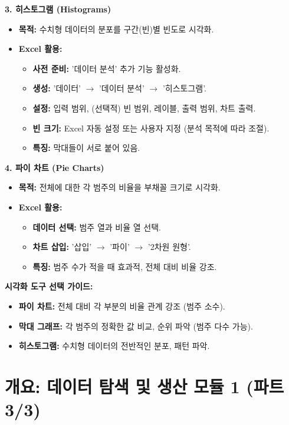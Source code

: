 \documentclass[11pt,a4paper]{article}
\begin{document}
\begin{tcolorbox}[colback=myblue!5!white,colframe=myblue!75!black,title=\textbf{데이터 요약 및 시각화 핵심 도구}]
\textbf{3. 히스토그램 (Histograms)}
\begin{itemize}
    \item \textbf{목적:} 수치형 데이터의 분포를 구간(빈)별 빈도로 시각화.
    \item \textbf{Excel 활용:}
    \begin{itemize}
        \item \textbf{사전 준비:} '데이터 분석' 추가 기능 활성화.
        \item \textbf{생성:} '데이터' $\rightarrow$ '데이터 분석' $\rightarrow$ '히스토그램'.
        \item \textbf{설정:} 입력 범위, (선택적) 빈 범위, 레이블, 출력 범위, 차트 출력.
        \item \textbf{빈 크기:} Excel 자동 설정 또는 사용자 지정 (분석 목적에 따라 조절).
        \item \textbf{특징:} 막대들이 서로 붙어 있음.
    \end{itemize}
\end{itemize}

\textbf{4. 파이 차트 (Pie Charts)}
\begin{itemize}
    \item \textbf{목적:} 전체에 대한 각 범주의 비율을 부채꼴 크기로 시각화.
    \item \textbf{Excel 활용:}
    \begin{itemize}
        \item \textbf{데이터 선택:} 범주 열과 비율 열 선택.
        \item \textbf{차트 삽입:} '삽입' $\rightarrow$ '파이' $\rightarrow$ '2차원 원형'.
        \item \textbf{특징:} 범주 수가 적을 때 효과적, 전체 대비 비율 강조.
    \end{itemize}
\end{itemize}

\textbf{시각화 도구 선택 가이드:}
\begin{itemize}
    \item \textbf{파이 차트:} 전체 대비 각 부분의 비율 관계 강조 (범주 소수).
    \item \textbf{막대 그래프:} 각 범주의 정확한 값 비교, 순위 파악 (범주 다수 가능).
    \item \textbf{히스토그램:} 수치형 데이터의 전반적인 분포, 패턴 파악.
\end{itemize}
\end{tcolorbox}

\newpage

\newpage
\section*{개요: 데이터 탐색 및 생산 모듈 1 (파트 3/3)}
\end{document}

